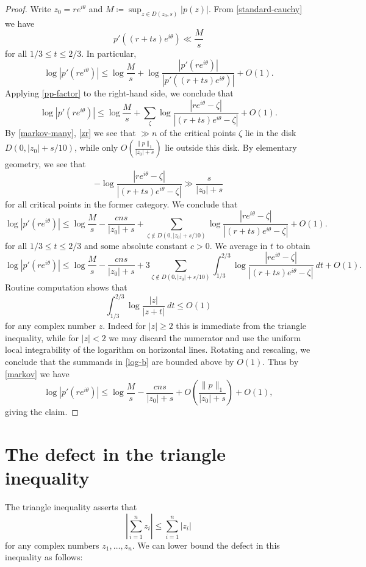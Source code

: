 \documentclass[12pt]{amsart}
\begin{document}
\begin{proof}  Write $z_0 = re^{i\theta}$ and $M \coloneqq \sup_{z \in D(z_0,s)} |p(z)|$.  From \eqref{standard-cauchy} we have
$$ p'((r+ts) e^{i\theta}) \ll \frac{M}{s}$$
for all $1/3 \leq t \leq 2/3$.  In particular,
$$
 \log |p'(re^{i\theta})| \leq \log \frac{M}{s} + \log \frac{|p'(re^{i\theta})|}{|p'((r+ts) e^{i\theta})|} + O(1).
$$
Applying \eqref{pp-factor} to the right-hand side, we conclude that
$$ \log |p'(re^{i\theta})| \leq \log \frac{M}{s} + \sum_\zeta \log \frac{|re^{i\theta}-\zeta|}{|(r+ts) e^{i\theta}-\zeta|} + O(1).$$
By \eqref{markov-many}, \eqref{zr} we see that $\gg n$ of the critical points $\zeta$ lie in the disk $D(0,|z_0| + s/10)$, while only $O(\frac{\|p\|_1}{|z_0|+s})$ lie outside this disk.  By elementary geometry, we see that
$$ -\log \frac{|re^{i\theta}-\zeta|}{|(r+ts) e^{i\theta}-\zeta|} \gg \frac{s}{|z_0|+s}$$
for all critical points in the former category.  We conclude that
$$ \log |p'(re^{i\theta})| \leq \log \frac{M}{s} - \frac{c n s}{|z_0|+s} + \sum_{\zeta \notin D(0,|z_0|+s/10)} \log \frac{|re^{i\theta}-\zeta|}{|(r+ts) e^{i\theta}-\zeta|} + O(1).$$
for all $1/3 \leq t \leq 2/3$ and some absolute constant $c>0$.  We average in $t$ to obtain
\begin{equation}\label{log-b}
     \log |p'(re^{i\theta})| \leq \log \frac{M}{s} - \frac{c n s}{|z_0|+s} + 3 \sum_{\zeta \notin D(0,|z_0|+s/10)} \int_{1/3}^{2/3} \log \frac{|re^{i\theta}-\zeta|}{|(r+ts) e^{i\theta}-\zeta|}\ dt + O(1).
\end{equation}
Routine computation shows that
$$ \int_{1/3}^{2/3} \log \frac{|z|}{|z + t|}\ dt \leq O(1)$$
for any complex number $z$. Indeed for $|z| \geq 2$ this is immediate from the triangle inequality, while for $|z| < 2$ we may discard the numerator and use the uniform local integrability of the logarithm on horizontal lines.  Rotating and rescaling, we conclude that the summands in \eqref{log-b} are bounded above by $O(1)$.  Thus by \eqref{markov} we have
$$ \log |p'(re^{i\theta})| \leq \log \frac{M}{s} - \frac{c n s}{|z_0|+s} + O\left(\frac{\|p\|_1}{|z_0|+s}\right) + O(1),$$
giving the claim.
\end{proof}

\section{The defect in the triangle inequality}\label{defect-sec}

The triangle inequality asserts that
$$ \left|\sum_{i=1}^n z_i\right| \leq \sum_{i=1}^n |z_i|$$
for any complex numbers $z_1,\dots,z_n$.  We can lower bound the defect in this inequality as follows:
\end{document}
